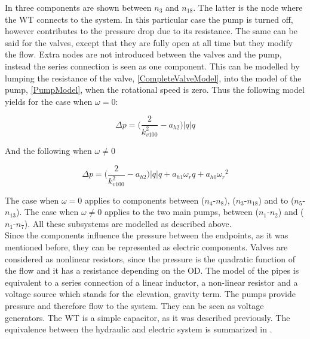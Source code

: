 In  three components are shown between $n_3$ and $n_{18}$. The latter is the node where the WT connects to the system. In this particular case the pump is turned off, however contributes to the pressure drop due to its resistance. The same can be said for the valves, except that they are fully open at all time but they modify the flow. Extra nodes are not introduced between the valves and the pump, instead the series connection is seen as one component. This can be modelled by lumping the resistance of the valve, \eqref{CompleteValveModel}, into the model of the pump, \eqref{PumpModel}, when the rotational speed is zero. Thus the following model yields for the case when $\omega = 0$:

\begin{equation}
  \Delta p = \Big(\frac{2}{k_{v100}^2} - a_{h2}\Big)|q| q 
  \label{omega_zero}
\end{equation}

And the following when $\omega \neq 0$

\begin{equation}
  \Delta p = \Big(\frac{2}{k_{v100}^2} - a_{h2}\Big)|q| q  + a_{h1} \omega_r q + a_{h0}{\omega_r}^2
  \label{omega_notzero}
\end{equation}

The case when $\omega = 0$ applies to components between ($n_4$-$n_8$), ($n_3$-$n_{18}$)  and to ($n_5$-$n_{13}$). The case when $\omega \neq 0$ applies to the two main pumps, between ($n_1$-$n_2$) and ($n_1$-$n_7$). All these subsystems are modelled as described above. 
\\
Since the components influence the pressure between the endpoints, as it was mentioned before, they can be represented as electric components. Valves are considered as nonlinear resistors, since the pressure is the quadratic function of the flow and it has a resistance depending on the OD. The model of the pipes is equivalent to a series connection of a linear inductor, a non-linear resistor and a voltage source which stands for the elevation, gravity term. The pumps provide pressure and therefore flow to the system. They can be seen as voltage generators. The WT is a simple capacitor, as it was described previously. The equivalence between the hydraulic and electric system is summarized in .

